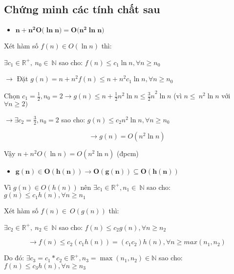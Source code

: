 \subsection{Chứng minh các tính chất sau}
\begin{itemize}
\item
  \(\mathbf{n +}\mathbf{n}^{\mathbf{2}}\mathbf{O(}\mathbf{\ln}\mathbf{n}\mathbf{) = O(}\mathbf{n}^{\mathbf{2}}\mathbf{\ln}\mathbf{n}\mathbf{)}\)
\end{itemize}

Xét hàm số \(f(n) \in O\left( \ln n \right)\) thì:

\(\exists c_{1} \in \mathbb{R}^{+},\ n_{0} \in \ \mathbb{N}\) sao cho:
\(f(n) \leq c_{1}\ln n,\forall n \geq n_{0}\)

\(\rightarrow\) Đặt
\(g(n) = n + n^{2}f(n) \leq n + n^{2}c_{1}\ln n,\forall n \geq n_{0}\ \)

Chọn
\(c_{1} = \frac{1}{2},n_{0} = 2 \rightarrow g(n) \leq n + \frac{1}{2}n^{2}\ln{n \leq {\frac{3}{2}n}^{2}\ln n}\)
(vì \(n \leq \ n^{2}\ln n\) với \(\forall n \geq 2)\)

\(\rightarrow \exists c_{2} = \frac{3}{2},n_{0} = 2\) sao cho:
\(g(n) \leq c_{2}n^{2}\ln n,\forall n \geq n_{0}\)

\[\rightarrow g(n) = O\left( n^{2}\ln n \right)\]

Vậy \(n + n^{2}O\left( \ln n \right) = O\left( n^{2}\ln n \right)\)
(đpcm)

\begin{itemize}
\item
  \(\mathbf{g}\left( \mathbf{n} \right)\mathbf{\in O}\left( \mathbf{h}\left( \mathbf{n} \right) \right)\mathbf{\rightarrow O}\left( \mathbf{g}\left( \mathbf{n} \right) \right)\mathbf{\subseteq O}\left( \mathbf{h}\left( \mathbf{n} \right) \right)\)
\end{itemize}

Vì \(g(n) \in O\left( h(n) \right)\) nên
\(\exists c_{1} \in \mathbb{R}^{+},n_{1} \in \ \mathbb{N}\) sao cho:
\(g(n) \leq c_{1}h(n),\forall n \geq n_{1}\)

Xét hàm số \(f(n) \in \ O(g(n))\) thì:

\(\exists c_{2} \in \mathbb{R}^{+},\ n_{2} \in \ \mathbb{N}\) sao cho:
\(f(n) \leq c_{2}g(n),\forall n \geq n_{2}\)

\[\rightarrow f(n) \leq c_{2}\left( c_{1}h(n) \right) = \left( c_{1}c_{2} \right)h(n),\forall n \geq max(n_{1},n_{2})\]

Do đó:
\(\exists c_{3} = c_{1}*c_{2} \in \mathbb{R}^{+},n_{3} = \max\left( n_{1},n_{2} \right) \in \mathbb{N}\)
sao cho: \(f(n) \leq c_{3}h(n),\forall n \geq n_{3}\)

